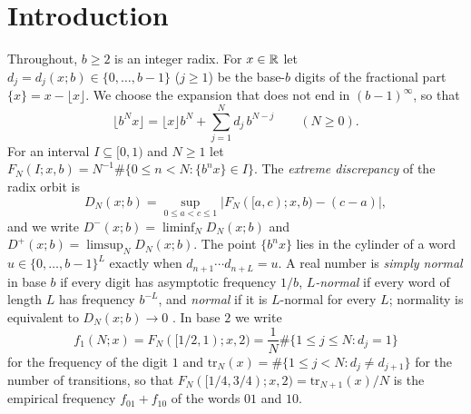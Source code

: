 \documentclass[11pt]{article}
\newcommand{\Ctrue}{C_{\mathrm{true}}}
\newcommand{\tr}{\mathrm{tr}}
\begin{document}
\begin{abstract}
Written proofs with finite certificates also give the exact mean $\Ctrue\in[1.339103,1.339116]$ of $s_2(\tau(n))$, show $D^-(E(2^k);2)\to1$, and treat odd-divisor, higher-divisor, unitary and base-$b$ divisor families in the same way. For radices $b$ that are not powers of $2$, the Senge--Straus theorem shows that the mean base-$b$ digit mass of $\tau(n)$ is infinite; more generally, the mean base-$b$ digit mass of $\tau_r(n)$ is bounded if and only if $r$ and $b$ are multiplicatively dependent. Transition counts, a minimal four-state signed-digit transducer and exact carry-density criteria treat cubic-character Lambert series and the threshold cases $E(4)$ and $E^*(4)=\sum\mu^2(m)/(4^m-1)$. Normality questions for $E(2)$, $E(4)$, $E_+(2)$ and $E_+(4)$ remain open.
\end{abstract}

\section{Introduction}\label{sec:intro}

Throughout, $b\ge2$ is an integer radix. For $x\in\mathbb R$ let $d_j=d_j(x;b)\in\{0,\dots,b-1\}$ ($j\ge1$) be the base-$b$ digits of the fractional part $\{x\}=x-\lfloor x\rfloor$. We choose the expansion that does not end in $(b-1)^\infty$, so that
\begin{equation}\label{eq:digits}
\lfloor b^Nx\rfloor=\lfloor x\rfloor b^N+\sum_{j=1}^N d_j\,b^{N-j}\qquad(N\ge0).
\end{equation}
For an interval $I\subseteq[0,1)$ and $N\ge1$ let $F_N(I;x,b)=N^{-1}\#\{0\le n<N:\{b^nx\}\in I\}$. The \emph{extreme discrepancy} of the radix orbit is
\[
D_N(x;b)=\sup_{0\le a<c\le1}\bigl|F_N([a,c);x,b)-(c-a)\bigr|,
\]
and we write $D^-(x;b)=\liminf_N D_N(x;b)$ and $D^+(x;b)=\limsup_N D_N(x;b)$. The point $\{b^nx\}$ lies in the cylinder of a word $u\in\{0,\dots,b-1\}^L$ exactly when $d_{n+1}\cdots d_{n+L}=u$. A real number is \emph{simply normal} in base $b$ if every digit has asymptotic frequency $1/b$, \emph{$L$-normal} if every word of length $L$ has frequency $b^{-L}$, and \emph{normal} if it is $L$-normal for every $L$; normality is equivalent to $D_N(x;b)\to0$ \cite[Chapter~1]{KN}. In base $2$ we write
\[
f_1(N;x)=F_N([1/2,1);x,2)=\frac1N\#\{1\le j\le N:d_j=1\}
\]
for the frequency of the digit $1$ and $\tr_N(x)=\#\{1\le j<N:d_j\ne d_{j+1}\}$ for the number of transitions, so that $F_N([1/4,3/4);x,2)=\tr_{N+1}(x)/N$ is the empirical frequency $f_{01}+f_{10}$ of the words $01$ and $10$.
\end{document}
